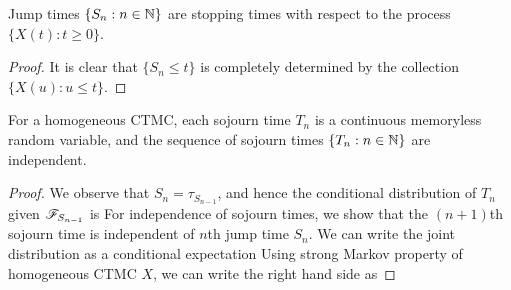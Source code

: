 \documentclass[a4paper,10pt,english]{article}
\begin{document}
\begin{lem} 
Jump times $\{S_n: n \in \mathbb{N}\}$ are stopping times with respect to the process $\{X(t): t \geqslant 0\}$. 
\end{lem}
\begin{proof}
It is clear that $\{S_n \leq t\}$ is completely determined by the collection $\{X(u): u \leqslant t\}$. 
\end{proof}
\begin{lem}
\label{Lemma:MemorylessSojourn}
For a homogeneous CTMC, each sojourn time $T_n$ is a continuous memoryless random variable, and the sequence of sojourn times $\{T_n: n \in \mathbb{N}\}$ are independent. %
\end{lem}
\begin{proof}
We observe that $S_n = \tau_{S_{n-1}}$, and hence the conditional distribution of $T_n$ given $\mathscr{F}_{S_{n-1}}$ is 
For independence of sojourn times, we show that the $(n+1)$th sojourn time is independent of $n$th jump time $S_n$. 
We can write the joint distribution as a conditional expectation
Using strong Markov property of homogeneous CTMC $X$, we can write the right hand side as 

\end{proof}
\end{document}
